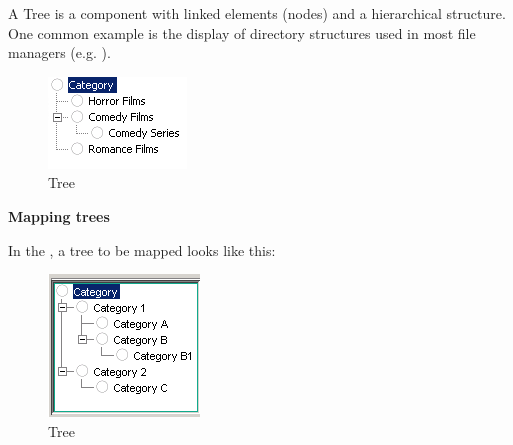 A Tree is a component with linked
elements (nodes) and a hierarchical structure. One common example is
the display of directory structures used in most file managers
(e.g. ).

\begin{figure}
\begin{center}
\includegraphics{PS/Tree}
\caption{Tree}
\label{tree}
\end{center}
\end{figure}

\textbf{Mapping trees}

In the \gdomm{}, a tree to be mapped looks like this:

\begin{figure}
\begin{center}
\includegraphics{PS/Maptree}
\caption{Tree}
\label{maptree}
\end{center}
\end{figure}